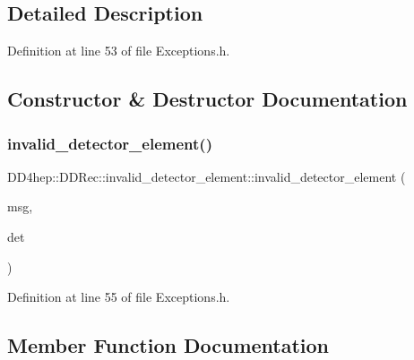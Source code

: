 \subsection{Detailed Description}


Definition at line 53 of file Exceptions.\+h.



\subsection{Constructor \& Destructor Documentation}
\hypertarget{class_d_d4hep_1_1_d_d_rec_1_1invalid__detector__element_af05d70f474fba21d10072fd98971f55e}{}\label{class_d_d4hep_1_1_d_d_rec_1_1invalid__detector__element_af05d70f474fba21d10072fd98971f55e} 
\subsubsection{\texorpdfstring{invalid\+\_\+detector\+\_\+element()}{invalid\_detector\_element()}}
{\footnotesize\ttfamily D\+D4hep\+::\+D\+D\+Rec\+::invalid\+\_\+detector\+\_\+element\+::invalid\+\_\+detector\+\_\+element (\begin{DoxyParamCaption}\item[{const std\+::string \&}]{msg,  }\item[{const \hyperlink{class_d_d4hep_1_1_geometry_1_1_det_element}{Geometry\+::\+Det\+Element} \&}]{det }\end{DoxyParamCaption})\hspace{0.3cm}{\ttfamily [inline]}}



Definition at line 55 of file Exceptions.\+h.



\subsection{Member Function Documentation}
\hypertarget{class_d_d4hep_1_1_d_d_rec_1_1invalid__detector__element_a8e490d00933ab26fc58cac741958ac50}{}\label{class_d_d4hep_1_1_d_d_rec_1_1invalid__detector__element_a8e490d00933ab26fc58cac741958ac50} 

